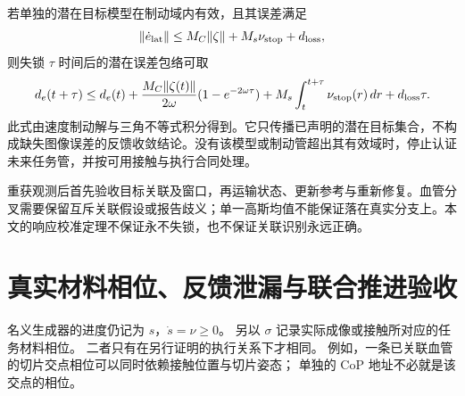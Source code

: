 \documentclass[11pt,a4paper]{article}
\numberwithin{equation}{section}
\theoremstyle{definition}
\begin{document}
若单独的潜在目标模型在制动域内有效，且其误差满足
\begin{equation}
 \|\dot e_{\rm lat}\|\le M_C\|\zeta\|+M_s\nu_{\rm stop}+d_{\rm loss},
\end{equation}
则失锁 $\tau$ 时间后的潜在误差包络可取
\begin{equation}
 d_e(t+\tau)\le d_e(t)
 +\frac{M_C\|\zeta(t)\|}{2\omega}(1-e^{-2\omega\tau})
 +M_s\int_t^{t+\tau}\nu_{\rm stop}(r)\,dr+d_{\rm loss}\tau.
 \label{eq:rev:loss-braking-tube}
\end{equation}
此式由速度制动解与三角不等式积分得到。它只传播已声明的潜在目标集合，不构成缺失图像误差的反馈收敛结论。没有该模型或制动管超出其有效域时，停止认证未来任务管，并按可用接触与执行合同处理。

重获观测后首先验收目标关联及窗口，再运输状态、更新参考与重新修复。血管分叉需要保留互斥关联假设或报告歧义；单一高斯均值不能保证落在真实分支上。本文的响应校准定理不保证永不失锁，也不保证关联识别永远正确。






\section{真实材料相位、反馈泄漏与联合推进验收}
\label{v44:sec:actual-phase}

名义生成器的进度仍记为 $s$，$\dot s=\nu\ge0$。
另以 $\sigma$ 记录实际成像或接触所对应的任务材料相位。
二者只有在另行证明的执行关系下才相同。
例如，一条已关联血管的切片交点相位可以同时依赖接触位置与切片姿态；
单独的 CoP 地址不必就是该交点的相位。
\end{document}
